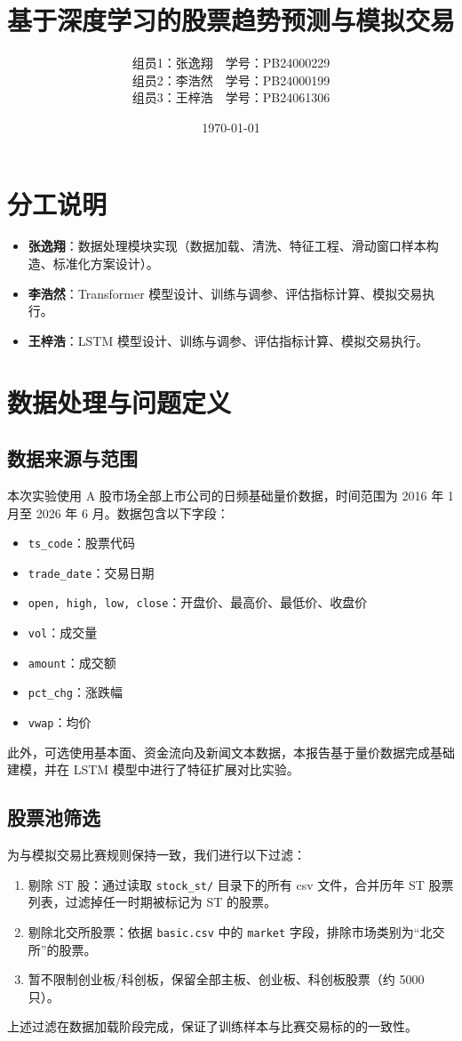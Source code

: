 \documentclass[12pt,a4paper]{ctexart}
\title{\textbf{基于深度学习的股票趋势预测与模拟交易}}
\author{
	组员1：张逸翔~~学号：PB24000229 \\
	组员2：李浩然~~学号：PB24000199 \\
	组员3：王梓浩~~学号：PB24061306 \\
}
\date{\today}
\begin{document}
	
	\maketitle
	\tableofcontents
	\newpage
	
	\section*{分工说明}
	\begin{itemize}
		\item \textbf{张逸翔}：数据处理模块实现（数据加载、清洗、特征工程、滑动窗口样本构造、标准化方案设计）。
		\item \textbf{李浩然}：Transformer 模型设计、训练与调参、评估指标计算、模拟交易执行。
		\item \textbf{王梓浩}：LSTM 模型设计、训练与调参、评估指标计算、模拟交易执行。
	\end{itemize}
	
	\section{数据处理与问题定义}
	
	\subsection{数据来源与范围}
	本次实验使用 A 股市场全部上市公司的日频基础量价数据，时间范围为 2016 年 1 月至 2026 年 6 月。数据包含以下字段：
	\begin{itemize}
		\item \texttt{ts\_code}：股票代码
		\item \texttt{trade\_date}：交易日期
		\item \texttt{open, high, low, close}：开盘价、最高价、最低价、收盘价
		\item \texttt{vol}：成交量
		\item \texttt{amount}：成交额
		\item \texttt{pct\_chg}：涨跌幅
		\item \texttt{vwap}：均价
	\end{itemize}
	此外，可选使用基本面、资金流向及新闻文本数据，本报告基于量价数据完成基础建模，并在 LSTM 模型中进行了特征扩展对比实验。
	
	\subsection{股票池筛选}
	为与模拟交易比赛规则保持一致，我们进行以下过滤：
	\begin{enumerate}
		\item 剔除 ST 股：通过读取 \texttt{stock\_st/} 目录下的所有 csv 文件，合并历年 ST 股票列表，过滤掉任一时期被标记为 ST 的股票。
		\item 剔除北交所股票：依据 \texttt{basic.csv} 中的 \texttt{market} 字段，排除市场类别为“北交所”的股票。
		\item 暂不限制创业板/科创板，保留全部主板、创业板、科创板股票（约 5000 只）。
	\end{enumerate}
	上述过滤在数据加载阶段完成，保证了训练样本与比赛交易标的的一致性。
	
\end{document}
